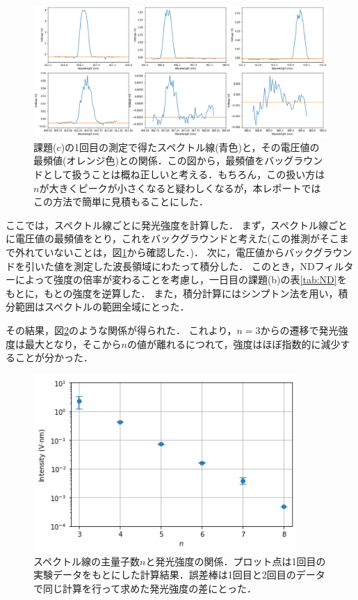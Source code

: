 \documentclass[titlepage]{jsarticle}
\begin{document}
\begin{figure}[htbp]
  \centering
  \includegraphics[width=15cm]{intensity_calc.png}
  \caption{課題(c)の1回目の測定で得たスペクトル線(青色)と，その電圧値の最頻値(オレンジ色)との関係．この図から，最頻値をバッグラウンドとして扱うことは概ね正しいと考える．もちろん，この扱い方は$n$が大きくピークが小さくなると疑わしくなるが，本レポートではこの方法で簡単に見積もることにした．}
  \label{fig:intensity_calc}
\end{figure}

ここでは，スペクトル線ごとに発光強度を計算した．
まず，スペクトル線ごとに電圧値の最頻値をとり，これをバックグラウンドと考えた(この推測がそこまで外れていないことは，図\ref{fig:intensity_calc}から確認した．)．
次に，電圧値からバックグラウンドを引いた値を測定した波長領域にわたって積分した．
このとき，NDフィルターによって強度の倍率が変わることを考慮し，一日目の課題(b)の表\ref{tab:ND}をもとに，もとの強度を逆算した．
また，積分計算にはシンプトン法を用い，積分範囲はスペクトルの範囲全域にとった．

その結果，図\ref{fig:intensity}のような関係が得られた．
これより，$n=3$からの遷移で発光強度は最大となり，そこから$n$の値が離れるにつれて，強度はほぼ指数的に減少することが分かった．

\begin{figure}[htbp]
  \centering
  \includegraphics[width=10cm]{intensity.png}
  \caption{スペクトル線の主量子数$n$と発光強度の関係．プロット点は1回目の実験データをもとにした計算結果．誤差棒は1回目と2回目のデータで同じ計算を行って求めた発光強度の差にとった．}
  \label{fig:intensity}
\end{figure}
\end{document}
